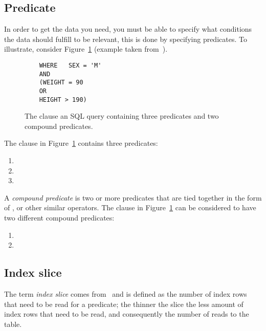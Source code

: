 \subsection*{Predicate}
In order to get the data you need, you must be able to specify what conditions
the data should fulfill to be relevant, this is done by specifying predicates.
To illustrate, consider Figure~\ref{fig:sql:predicate} (example taken
from~\cite{lahdenmaki_2005_relational_rdidatodossea}).

\begin{figure}[ht]
  \begin{verbatim}
    WHERE   SEX = 'M'
    AND
    (WEIGHT = 90
    OR
    HEIGHT > 190)
  \end{verbatim}
  \caption[The  clause of a query containing three predicates and two
  compound predicates]{The  clause an SQL query containing three
    predicates and two compound predicates.}\label{fig:sql:predicate}
\end{figure}

The  clause in Figure~\ref{fig:sql:predicate} contains three
predicates:
\begin{enumerate}
\item {}
\item {}
\item {}
\end{enumerate}

A \textit{compound predicate} is two or more predicates that are tied together
in the form of ,  or other similar operators. The 
clause in Figure~\ref{fig:sql:predicate} can be considered to have two different
compound predicates:
\begin{enumerate}
\item {}
\item {}
\end{enumerate}

\subsection*{Index slice}
The term \textit{index slice} comes
from~\cite{lahdenmaki_2005_relational_rdidatodossea} and is defined as the
number of index rows that need to be read for a predicate; the thinner the slice
the less amount of index rows that need to be read, and consequently the number
of reads to the table.

